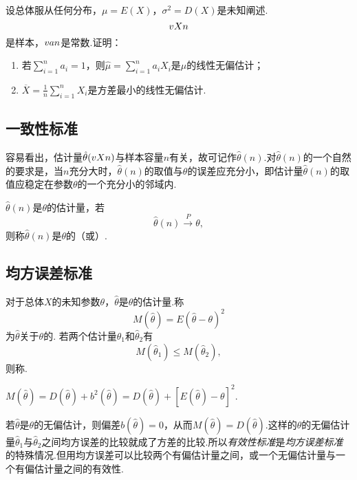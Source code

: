 \begin{example}
设总体服从任何分布，\(\mu=E(X)\)，\(\sigma^2=D(X)\)是未知阐述.\[
v{X}{n}
\]是样本，\(v{a}{n}\)是常数.证明：
\begin{enumerate}
\item 若\(\sum\limits_{i=1}^n{a_i}=1\)，则\(\hat{\mu}=\sum\limits_{i=1}^n{a_i X_i}\)是\(\mu\)的线性无偏估计；
\item \(\overline{X} = \frac{1}{n} \sum\limits_{i=1}^n{X_i}\)是方差最小的线性无偏估计.
\end{enumerate}
\end{example}

\subsection{一致性标准}
容易看出，估计量\(\hat{\theta}(v{X}{n})\)与样本容量\(n\)有关，故可记作\(\hat{\theta}(n)\).对\(\hat{\theta}(n)\)的一个自然的要求是，当\(n\)充分大时，\(\hat{\theta}(n)\)的取值与\(\theta\)的误差应充分小，即估计量\(\hat{\theta}(n)\)的取值应稳定在参数\(\theta\)的一个充分小的邻域内.
\begin{definition}
\(\hat{\theta}(n)\)是\(\theta\)的估计量，若\[
\hat{\theta}(n) \overset{P}{\longrightarrow} \theta,
\]则称\(\hat{\theta}(n)\)是\(\theta\)的（或）.
\end{definition}

\subsection{均方误差标准}
\begin{definition}
对于总体\(X\)的未知参数\(\theta\)，\(\hat{\theta}\)是\(\theta\)的估计量.称\[
M(\hat{\theta}) = E(\hat{\theta} - \theta)^2
\]为\(\hat{\theta}\)关于\(\theta\)的.
若两个估计量\(\hat{\theta}_1\)和\(\hat{\theta}_2\)有\[
M(\hat{\theta}_1) \leqslant M(\hat{\theta}_2),
\]则称.
\end{definition}

\begin{theorem}
\(M(\hat{\theta}) = D(\hat{\theta}) + b^2(\hat{\theta})
= D(\hat{\theta}) + [E(\hat{\theta}) - \theta]^2.\)
\end{theorem}
若\(\hat{\theta}\)是\(\theta\)的无偏估计，则偏差\(b(\hat{\theta})=0\)，从而\(M(\hat{\theta})=D(\hat{\theta})\).这样的\(\theta\)的无偏估计量\(\hat{\theta}_1\)与\(\hat{\theta}_2\)之间均方误差的比较就成了方差的比较.所以\emph{有效性标准}是\emph{均方误差标准}的特殊情况.但用均方误差可以比较两个有偏估计量之间，或一个无偏估计量与一个有偏估计量之间的有效性.

